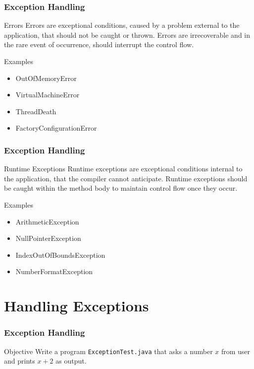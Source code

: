 \documentclass[10pt, compress]{beamer}
\begin{document}
\begin{frame}[fragile]
	\frametitle{Exception Handling}
	\begin{block}{Errors}
		Errors are exceptional conditions, caused by a problem external to the application, that \alert{should not} be caught or thrown. Errors are irrecoverable and in the rare event of occurrence, should interrupt the control flow.
	\end{block}
	\begin{block}{Examples}
		\begin{itemize}
			\item[] OutOfMemoryError
			\item[] VirtualMachineError
			\item[] ThreadDeath
			\item[] FactoryConfigurationError
		\end{itemize}
	\end{block}
\end{frame}

\begin{frame}[fragile]
	\frametitle{Exception Handling}
	\begin{block}{Runtime Exceptions}
		Runtime exceptions are exceptional conditions internal to the application, that the compiler cannot anticipate. Runtime exceptions \alert{should be} caught within the method body to maintain control flow once they occur.
	\end{block}
	\begin{block}{Examples}
		\begin{itemize}
			\item[] ArithmeticException
			\item[] NullPointerException
			\item[] IndexOutOfBoundsException
			\item[] NumberFormatException
		\end{itemize}
	\end{block}
\end{frame}

\section{Handling Exceptions}

\begin{frame}[fragile]
	\frametitle{Exception Handling}
	\begin{block}{Objective}
		Write a program \texttt{ExceptionTest.java} that asks a number $x$ from user and prints $x+2$ as output.
	\end{block}
\end{frame}
\end{document}
